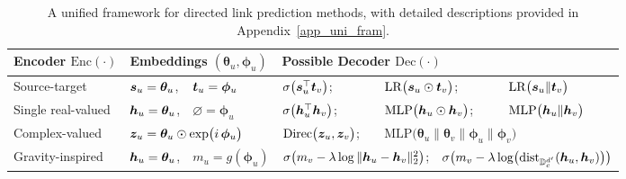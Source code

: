 \begin{table*}[ht]
\centering
\caption{A unified framework for directed link prediction methods, with detailed descriptions provided in Appendix~\ref{app_uni_fram}.}
\label{table_fram}
\begin{tabular}{@{}lllllllll@{}}
\toprule
Encoder $\mathrm{Enc}(\cdot)$ 
 &\multicolumn{2}{l}{Embeddings $({\bm \theta_u}, {\bm \phi_u})$}
 &\multicolumn{6}{l}{Possible Decoder $\mathrm{Dec}(\cdot)$}\\
\midrule
Source-target  & ${\bm{s}}_u = \bm{\theta}_u$,           & ${\bm{t}}_u = \bm{\phi}_u$          & \multicolumn{2}{l}{$\sigma\bigl({\bm{s}}_u^{\top}{\bm{t}}_v\bigr)$;} & \multicolumn{2}{l}{$\mathrm{LR}\bigl({\bm{s}}_u \odot {\bm{t}}_v\bigr)$;} & \multicolumn{2}{l}{\quad$\mathrm{LR}\bigl({\bm{s}}_u \|{\bm{t}}_v\bigr)$} \\[3.0pt]

Single real-valued  & ${\bm{h}}_u = \bm{\theta}_u$,  & $\varnothing = \bm{\phi}_u$          & \multicolumn{2}{l}{$\sigma\bigl({\bm{h}}_u^{\top}{\bm{h}}_v\bigr)$;} & \multicolumn{2}{l}{$\mathrm{MLP}\bigl({\bm{h}}_u \odot {\bm{h}}_v\bigr)$;} & \multicolumn{2}{l}{\quad$\mathrm{MLP}\bigl({\bm{h}}_u \|{\bm{h}}_v\bigr)$} \\[3.0pt]

Complex-valued  & \multicolumn{2}{l}{${\bm{z}}_u = \bm{\theta}_u\odot\exp\bigl(i\,\bm{\phi}_u\bigr)$}  & \multicolumn{2}{l}{$\mathrm{Direc}\bigl({\bm{z}}_u,{\bm{z}}_v\bigr)$;} & \multicolumn{4}{l}{$\mathrm{MLP}\bigl(\bm{\theta}_u \|\bm{\theta}_v \|\bm{\phi}_u \|\bm{\phi}_v\bigr)$} \\[3.0pt]

Gravity-inspired  & ${\bm{h}}_u = \bm{\theta}_u$,  &$m_u = g(\bm{\phi}_u)$         & \multicolumn{3}{l}{$\sigma\bigl(m_v - \lambda\log\|{\bm{h}}_u-{\bm{h}}_v\|_2^2\bigr)$;}              & \multicolumn{3}{l}{$\sigma\bigl(m_v - \lambda\log \bigl(\mathrm{dist}_{\mathbb{D}_c^{d'}}({\bm{h}}_u,{\bm{h}}_v)\bigr)\bigr)$}  \\
\bottomrule
\end{tabular}
\end{table*}

